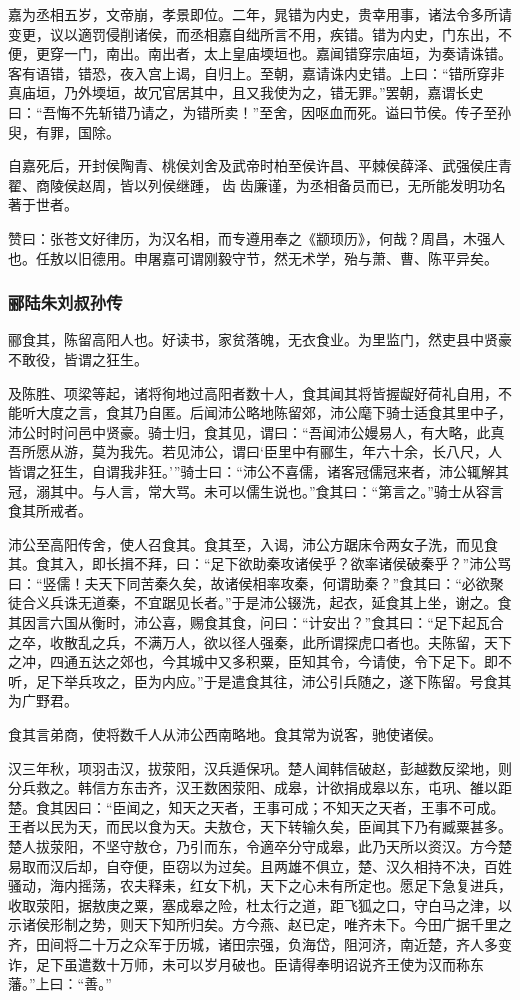 \documentclass[]{article}
\begin{document}
嘉为丞相五岁，文帝崩，孝景即位。二年，晁错为内史，贵幸用事，诸法令多所请变更，议以適罚侵削诸侯，而丞相嘉自绌所言不用，疾错。错为内史，门东出，不便，更穿一门，南出。南出者，太上皇庙堧垣也。嘉闻错穿宗庙垣，为奏请诛错。客有语错，错恐，夜入宫上谒，自归上。至朝，嘉请诛内史错。上曰：``错所穿非真庙垣，乃外堧垣，故冗官居其中，且又我使为之，错无罪。''罢朝，嘉谓长史曰：``吾悔不先斩错乃请之，为错所卖！''至舍，因呕血而死。谥曰节侯。传子至孙臾，有罪，国除。

自嘉死后，开封侯陶青、桃侯刘舍及武帝时柏至侯许昌、平棘侯薛泽、武强侯庄青翟、商陵侯赵周，皆以列侯继踵，齿齿廉谨，为丞相备员而已，无所能发明功名著于世者。

赞曰：张苍文好律历，为汉名相，而专遵用奉之《颛顼历》，何哉？周昌，木强人也。任敖以旧德用。申屠嘉可谓刚毅守节，然无术学，殆与萧、曹、陈平异矣。

\hypertarget{header-n3914}{%
\subsubsection{郦陆朱刘叔孙传}\label{header-n3914}}

郦食其，陈留高阳人也。好读书，家贫落魄，无衣食业。为里监门，然吏县中贤豪不敢役，皆谓之狂生。

及陈胜、项梁等起，诸将徇地过高阳者数十人，食其闻其将皆握龊好荷礼自用，不能听大度之言，食其乃自匿。后闻沛公略地陈留郊，沛公麾下骑士适食其里中子，沛公时时问邑中贤豪。骑士归，食其见，谓曰：``吾闻沛公嫚易人，有大略，此真吾所愿从游，莫为我先。若见沛公，谓曰`臣里中有郦生，年六十余，长八尺，人皆谓之狂生，自谓我非狂。'''骑士曰：``沛公不喜儒，诸客冠儒冠来者，沛公辄解其冠，溺其中。与人言，常大骂。未可以儒生说也。''食其曰：``第言之。''骑士从容言食其所戒者。

沛公至高阳传舍，使人召食其。食其至，入谒，沛公方踞床令两女子洗，而见食其。食其入，即长揖不拜，曰：``足下欲助秦攻诸侯乎？欲率诸侯破秦乎？''沛公骂曰：``竖儒！夫天下同苦秦久矣，故诸侯相率攻秦，何谓助秦？''食其曰：``必欲聚徒合义兵诛无道秦，不宜踞见长者。''于是沛公辍洗，起衣，延食其上坐，谢之。食其因言六国从衡时，沛公喜，赐食其食，问曰：``计安出？''食其曰：``足下起瓦合之卒，收散乱之兵，不满万人，欲以径人强秦，此所谓探虎口者也。夫陈留，天下之冲，四通五达之郊也，今其城中又多积粟，臣知其令，今请使，令下足下。即不听，足下举兵攻之，臣为内应。''于是遣食其往，沛公引兵随之，遂下陈留。号食其为广野君。

食其言弟商，使将数千人从沛公西南略地。食其常为说客，驰使诸侯。

汉三年秋，项羽击汉，拔荥阳，汉兵遁保巩。楚人闻韩信破赵，彭越数反梁地，则分兵救之。韩信方东击齐，汉王数困荥阳、成皋，计欲捐成皋以东，屯巩、雒以距楚。食其因曰：``臣闻之，知天之天者，王事可成；不知天之天者，王事不可成。王者以民为天，而民以食为天。夫敖仓，天下转输久矣，臣闻其下乃有臧粟甚多。楚人拔荥阳，不坚守敖仓，乃引而东，令適卒分守成皋，此乃天所以资汉。方今楚易取而汉后却，自夺便，臣窃以为过矣。且两雄不俱立，楚、汉久相持不决，百姓骚动，海内摇荡，农夫释耒，红女下机，天下之心未有所定也。愿足下急复进兵，收取荥阳，据敖庚之粟，塞成皋之险，杜太行之道，距飞狐之口，守白马之津，以示诸侯形制之势，则天下知所归矣。方今燕、赵已定，唯齐未下。今田广据千里之齐，田间将二十万之众军于历城，诸田宗强，负海岱，阻河济，南近楚，齐人多变诈，足下虽遣数十万师，未可以岁月破也。臣请得奉明诏说齐王使为汉而称东藩。''上曰：``善。''
\end{document}
